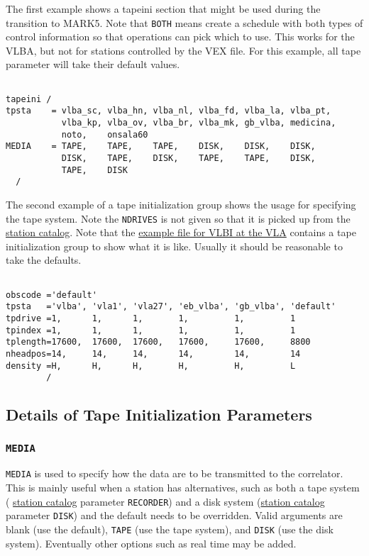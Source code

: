 \documentclass{report}
\begin{document}
The first example shows a tapeini section that might be used during
the transition to MARK5.  Note that {\tt BOTH} means create a
schedule with both types of control information so that operations
can pick which to use.  This works for the VLBA, but not for
stations controlled by the VEX file.  For this example, all
tape parameter will take their default values.

\begin{verbatim}

tapeini /
tpsta    = vlba_sc, vlba_hn, vlba_nl, vlba_fd, vlba_la, vlba_pt,
           vlba_kp, vlba_ov, vlba_br, vlba_mk, gb_vlba, medicina,
           noto,    onsala60
MEDIA    = TAPE,    TAPE,    TAPE,    DISK,    DISK,    DISK,
           DISK,    TAPE,    DISK,    TAPE,    TAPE,    DISK,
           TAPE,    DISK
  /
\end{verbatim}

The second example of a tape initialization group shows the usage for
specifying the tape system.  Note the {\tt NDRIVES} is not given so
that it is picked up from the 
{\hyperref[SEC:STACAT]{station catalog}}.
Note that the 
{\hyperref[SSSEC:VLBIEG]{example file for VLBI at the VLA}}
contains a tape initialization group to show what it is like.  Usually
it should be reasonable to take the defaults.


\begin{verbatim}

obscode ='default'
tpsta   ='vlba', 'vla1', 'vla27', 'eb_vlba', 'gb_vlba', 'default'
tpdrive =1,      1,      1,       1,         1,         1
tpindex =1,      1,      1,       1,         1,         1
tplength=17600,  17600,  17600,   17600,     17600,     8800
nheadpos=14,     14,     14,      14,        14,        14
density =H,      H,      H,       H,         H,         L
        /

\end{verbatim}

\subsection{Details of Tape Initialization Parameters}

\subsubsection{\label{TP:MEDIA}{\tt MEDIA}}

{\tt MEDIA} is used to specify how the data are to be transmitted to
the correlator.  This is mainly useful when a station has
alternatives, such as both a tape system (
{\hyperref[SEC:STACAT]{station catalog}}
parameter {\tt RECORDER}) and a disk system
({\hyperref[SEC:STACAT]{station catalog}} parameter {\tt DISK}) and the
default needs to be overridden.  Valid arguments are blank (use the
default), {\tt TAPE} (use the tape system), and {\tt DISK} (use the
disk system).  Eventually other options such as real time may be
added.
\end{document}
